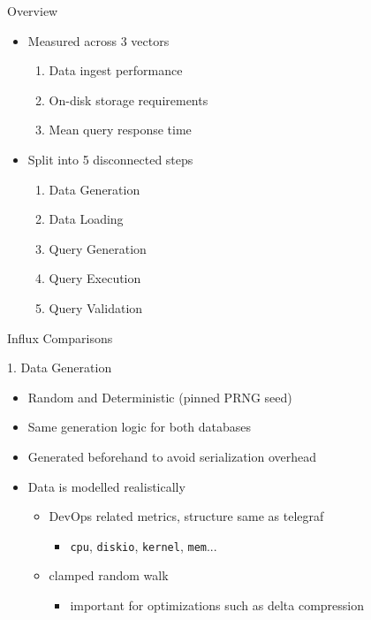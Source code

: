 \documentclass[compress,aspectratio=169]{beamer}
\begin{document}
\begin{frame}{Overview}
\begin{itemize}
  \item Measured across 3 vectors
  \begin{enumerate}
    \item Data ingest performance
    \item On-disk storage requirements
    \item Mean query response time
  \end{enumerate}
\item Split into 5 disconnected steps
  \begin{enumerate}
    \item Data Generation
    \item Data Loading
    \item Query Generation
    \item Query Execution
    \item Query Validation
  \end{enumerate}
\end{itemize}
\end{frame}

\begin{frame}{Influx Comparisons}
\begin{block}{1. Data Generation}
\begin{itemize}
  \item Random and Deterministic (pinned PRNG seed)
  \item Same generation logic for both databases
  \item Generated beforehand to avoid serialization overhead
  \item Data is modelled realistically
  \begin{itemize}
    \item DevOps related metrics, structure same as telegraf
    \begin{itemize}
      \item \texttt{cpu}, \texttt{diskio}, \texttt{kernel}, \texttt{mem}...
    \end{itemize}
    \item clamped random walk
    \begin{itemize}
      \item important for optimizations such as delta compression
    \end{itemize}
  \end{itemize}
\end{itemize}
\end{block}
\end{frame}
\end{document}

